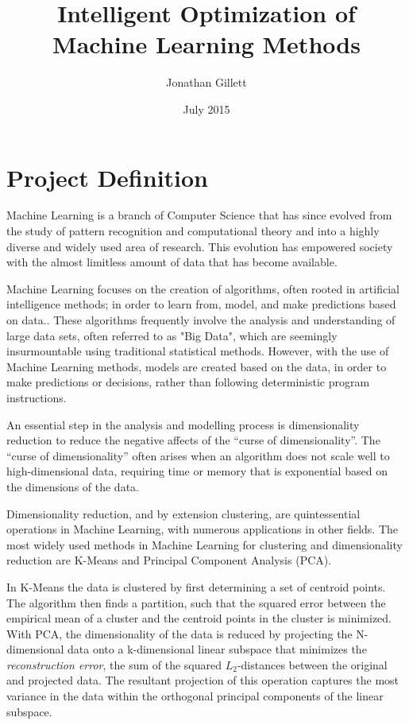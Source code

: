 \documentclass{article}
\title{Intelligent Optimization of Machine Learning Methods}
\author{Jonathan Gillett}
\date{July 2015}
\begin{document}
\maketitle


\section{Project Definition}

Machine Learning is a branch of Computer Science that has since evolved from the study of pattern recognition and computational theory and into a highly diverse and widely used area of research. This evolution has empowered society with the almost limitless amount of data that has become available\cite{lohr2012age, mohri2012foundations}.

Machine Learning focuses on the creation of algorithms, often rooted in artificial intelligence methods; in order to learn from, model, and make predictions based on data.\cite{dietterich2002machine}. These algorithms frequently involve the analysis and understanding of large data sets, often referred to as "Big Data", which are seemingly insurmountable using traditional statistical methods\cite{lohr2012age}. However, with the use of Machine Learning methods, models are created based on the data, in order to make predictions or decisions, rather than following deterministic program instructions\cite{bishop2006pattern}.

An essential step in the analysis and modelling process is dimensionality reduction to reduce the negative affects of the ``curse of dimensionality''. The ``curse of dimensionality'' often arises when an algorithm does not scale well to high-dimensional data, requiring time or memory that is exponential based on the dimensions of the data\cite{domingos2012few}. 

Dimensionality reduction, and by extension clustering, are quintessential operations in Machine Learning, with numerous applications in other fields. The most widely used methods in Machine Learning for clustering and dimensionality reduction are K-Means and Principal Component Analysis (PCA)\cite{jain2010, domingos2012few, dietterich2002machine}.

In K-Means the data is clustered by first determining a set of centroid points. The algorithm then finds a partition, such that the squared error between the empirical mean of a cluster and the centroid points in the cluster is minimized\cite{jain2010, bishop2006pattern}. With PCA, the dimensionality of the data is reduced by projecting the N-dimensional data onto a k-dimensional linear subspace that minimizes the \emph{reconstruction error}, the sum of the squared $L_2$-distances between the original and projected data. The resultant projection of this operation captures the most variance in the data within the orthogonal principal components of the linear subspace\cite{jolliffe2002principal, mohri2012foundations, bishop2006pattern}.
\end{document}
